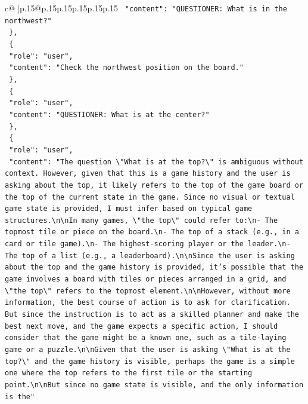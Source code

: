 \documentclass{article}
\begin{document}
{\begin{supertabular}{c@{$\;$}|p{.15\linewidth}@{}p{.15\linewidth}p{.15\linewidth}p{.15\linewidth}p{.15\linewidth}p{.15\linewidth}}
{{{\texttt{    "content": "QUESTIONER: What is in the northwest?"} \\
\texttt{  \},} \\
\texttt{  \{} \\
\texttt{    "role": "user",} \\
\texttt{    "content": "Check the northwest position on the board."} \\
\texttt{  \},} \\
\texttt{  \{} \\
\texttt{    "role": "user",} \\
\texttt{    "content": "QUESTIONER: What is at the center?"} \\
\texttt{  \},} \\
\texttt{  \{} \\
\texttt{    "role": "user",} \\
\texttt{    "content": "The question \textbackslash{}"What is at the top?\textbackslash{}" is ambiguous without context. However, given that this is a game history and the user is asking about the top, it likely refers to the top of the game board or the top of the current state in the game. Since no visual or textual game state is provided, I must infer based on typical game structures.\textbackslash{}n\textbackslash{}nIn many games, \textbackslash{}"the top\textbackslash{}" could refer to:\textbackslash{}n{-} The topmost tile or piece on the board.\textbackslash{}n{-} The top of a stack (e.g., in a card or tile game).\textbackslash{}n{-} The highest{-}scoring player or the leader.\textbackslash{}n{-} The top of a list (e.g., a leaderboard).\textbackslash{}n\textbackslash{}nSince the user is asking about the top and the game history is provided, it's possible that the game involves a board with tiles or pieces arranged in a grid, and \textbackslash{}"the top\textbackslash{}" refers to the topmost element.\textbackslash{}n\textbackslash{}nHowever, without more information, the best course of action is to ask for clarification. But since the instruction is to act as a skilled planner and make the best next move, and the game expects a specific action, I should consider that the game might be a known one, such as a tile{-}laying game or a puzzle.\textbackslash{}n\textbackslash{}nGiven that the user is asking \textbackslash{}"What is at the top?\textbackslash{}" and the game history is visible, perhaps the game is a simple one where the top refers to the first tile or the starting point.\textbackslash{}n\textbackslash{}nBut since no game state is visible, and the only information is the"} \\
}}}
\end{supertabular}}
\end{document}
